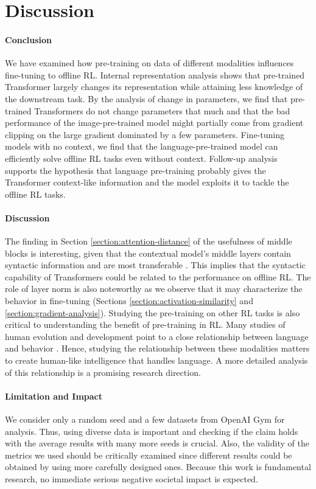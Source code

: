 \section{Discussion}
\label{section:discussion}
\paragraph{Conclusion}
We have examined how pre-training on data of different modalities influences fine-tuning to offline RL. Internal representation analysis shows that pre-trained Transformer largely changes its representation while attaining less knowledge of the downstream task. By the analysis of change in parameters, we find that pre-trained Transformers do not change parameters that much and that the bad performance of the image-pre-trained model might partially come from gradient clipping on the large gradient dominated by a few parameters. Fine-tuning models with no context, we find that the language-pre-trained model can efficiently solve offline RL tasks even without context. Follow-up analysis supports the hypothesis that language pre-training probably gives the Transformer context-like information and the model exploits it to tackle the offline RL tasks.

\paragraph{Discussion}
The finding in Section \ref{section:attention-distance} of the usefulness of middle blocks is interesting, given that the contextual model's middle layers contain syntactic information \cite{hewitt-manning-2019-structural,goldberg2019assessing} and are most transferable \cite{liu-etal-2019-linguistic}. This implies that the syntactic capability of Transformers could be related to the performance on offline RL. The role of layer norm is also noteworthy as we observe that it may characterize the behavior in fine-tuning (Sections \ref{section:activation-similarity} and \ref{section:gradient-analysis}). Studying the pre-training on other RL tasks is also critical to understanding the benefit of pre-training in RL. Many studies of human evolution and development point to a close relationship between language and behavior \cite{lashley1951,greenfield1991language}. Hence, studying the relationship between these modalities matters to create human-like intelligence that handles language. A more detailed analysis of this relationship is a promising research direction.

\paragraph{Limitation and Impact}
We consider only a random seed and a few datasets from OpenAI Gym for analysis. 
Thus, using diverse data is important and checking if the claim holds with the average results with many more seeds is crucial.
Also, the validity of the metrics we used should be critically examined since different results could be obtained by using more carefully designed ones. Because this work is fundamental research, no immediate serious negative societal impact is expected.
